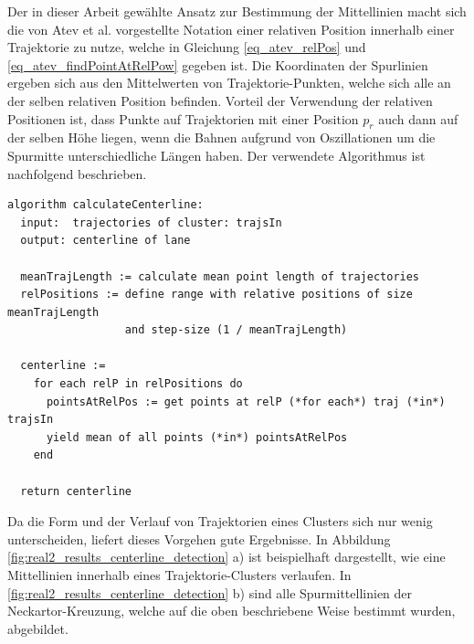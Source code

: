 Der in dieser Arbeit gewählte Ansatz zur Bestimmung der Mittellinien macht sich die von Atev et al.
vorgestellte Notation einer relativen Position innerhalb einer Trajektorie zu nutze, welche in
Gleichung \ref{eq_atev_relPos} und \ref{eq_atev_findPointAtRelPow} gegeben ist.
Die Koordinaten der Spurlinien ergeben sich aus den Mittelwerten von Trajektorie-Punkten, welche sich
alle an der selben relativen Position befinden. Vorteil der Verwendung der relativen Positionen ist,
dass Punkte auf Trajektorien mit einer Position $p_r$ auch dann auf der selben Höhe liegen,
wenn die Bahnen aufgrund von Oszillationen um die Spurmitte unterschiedliche Längen haben.
Der verwendete Algorithmus ist nachfolgend beschrieben.
\begin{lstlisting}[caption=Pseudocode Mittellinien-Bestimmung, language=Pseudo, label=lst:pseudo_centerline_definition]
algorithm calculateCenterline:
  input:  trajectories of cluster: trajsIn
  output: centerline of lane

  meanTrajLength := calculate mean point length of trajectories
  relPositions := define range with relative positions of size meanTrajLength
                  and step-size (1 / meanTrajLength)

  centerline :=
    for each relP in relPositions do
      pointsAtRelPos := get points at relP (*for each*) traj (*in*) trajsIn
      yield mean of all points (*in*) pointsAtRelPos
    end

  return centerline
\end{lstlisting}

Da die Form und der Verlauf von Trajektorien eines Clusters sich nur wenig unterscheiden, liefert dieses
Vorgehen gute Ergebnisse. In Abbildung \ref{fig:real2_results_centerline_detection} a) ist beispielhaft
dargestellt, wie eine Mittellinien innerhalb eines Trajektorie-Clusters verlaufen.
In \ref{fig:real2_results_centerline_detection} b) sind alle Spurmittellinien der Neckartor-Kreuzung,
welche auf die oben beschriebene Weise bestimmt wurden, abgebildet.

